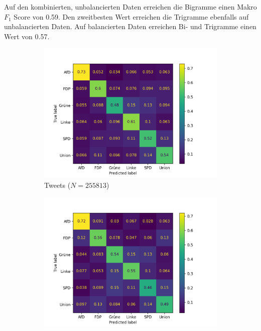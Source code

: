 Auf den kombinierten, unbalancierten Daten erreichen die Bigramme einen Makro \(F_1\) Score von \num{0.59}. Den zweitbesten Wert erreichen die Trigramme ebenfalls auf unbalancierten Daten. Auf balancierten Daten erreichen Bi- und Trigramme einen Wert von \num{0.57}.


\begin{figure}[H]
    \centering
    \begin{subfigure}{0.49\textwidth}
      \includegraphics[width=\textwidth]{data/images/modeling/fasttext/under/tweets_confusion_matrix.png}
      \caption{Tweets (\(N = \num{255813}\))} \label{sfig:confusionMatrixFastTextTweetsBalanced}
    \end{subfigure}
    \hfill
    \begin{subfigure}{0.49\textwidth}
      \includegraphics[width=\textwidth]{data/images/modeling/fasttext/under/party_programs_confusion_matrix.png}

\end{subfigure}
\end{figure}
